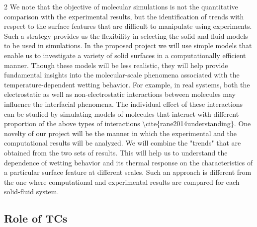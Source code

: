 \par 2 We note that the objective of molecular simulations is not the quantitative comparison with the experimental results, but the identification of trends with respect to the surface features that are difficult to manipulate using experiments. Such a strategy provides us the flexibility in selecting the solid and fluid models to be used in simulations. In the proposed project we will use simple models that enable us to investigate a variety of solid surfaces in a computationally efficient manner. Though these models will be less realistic, they will help provide fundamental insights into the molecular-scale phenomena associated with the temperature-dependent wetting behavior. For example, in real systems, both the electrostatic as well as non-electrostatic interactions between molecules may influence the interfacial phenomena. The individual effect of these interactions can be studied by simulating models of molecules that interact with different proportion of the above types of interactions \textbackslash cite\{rane2014understanding\}. One novelty of our project will be the manner in which the experimental and the computational results will be analyzed. We will combine the "trends" that are obtained from the two sets of results. This will help us to understand the dependence of wetting behavior and its thermal response on the characteristics of a particular surface feature at different scales. Such an approach is different from the one where computational and experimental results are compared for each solid-fluid system.\subsection{Role of TCs}

